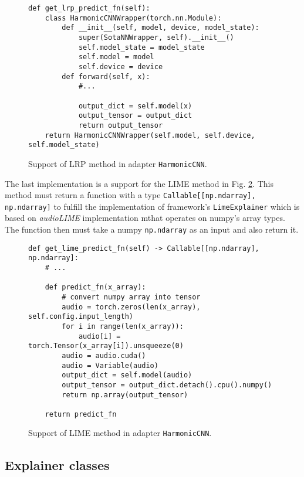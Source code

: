 \documentclass[
    bindingoffset=5mm,  %
    footnoteindent=3mm, %
    hyphenation=true    %
]{src/wut-thesis}
\begin{document}
\begin{figure}%
\begin{verbatim}
def get_lrp_predict_fn(self):
    class HarmonicCNNWrapper(torch.nn.Module):
        def __init__(self, model, device, model_state):
            super(SotaNNWrapper, self).__init__()
            self.model_state = model_state
            self.model = model 
            self.device = device
        def forward(self, x):
            #...

            output_dict = self.model(x)
            output_tensor = output_dict
            return output_tensor
    return HarmonicCNNWrapper(self.model, self.device, self.model_state)
\end{verbatim}
\caption{Support of LRP method in adapter \texttt{HarmonicCNN}.}
\label{fig:HarmonicLrpOverload}
\end{figure}

The last implementation is a support for the LIME method in Fig. \ref{fig:HarmonicLLIMEOverload}.
This method must return a function with a type \texttt{Callable[[np.ndarray], np.ndarray]}
to fulfill the implementation of framework’s \texttt{LimeExplainer} which is based on \textit{audioLIME}
implementation mthat operates on numpy’s array types. The function then must
take a numpy \texttt{np.ndarray} as an input and also return it.

\begin{figure}[h!]
\begin{verbatim}
def get_lime_predict_fn(self) -> Callable[[np.ndarray], np.ndarray]:
    # ...

    def predict_fn(x_array):
        # convert numpy array into tensor
        audio = torch.zeros(len(x_array), self.config.input_length)
        for i in range(len(x_array)):
            audio[i] = torch.Tensor(x_array[i]).unsqueeze(0)
        audio = audio.cuda()
        audio = Variable(audio)
        output_dict = self.model(audio)
        output_tensor = output_dict.detach().cpu().numpy()
        return np.array(output_tensor)

    return predict_fn
\end{verbatim}
\caption{Support of LIME method in adapter \texttt{HarmonicCNN}.}
\label{fig:HarmonicLLIMEOverload}
\end{figure}

\subsection{Explainer classes}
\end{document}
